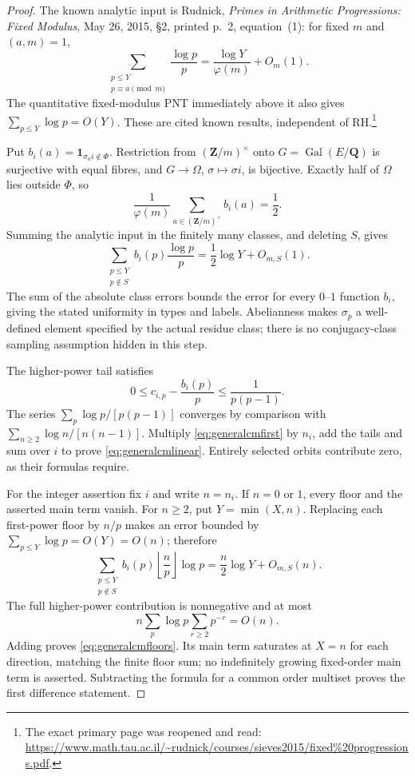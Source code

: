 \begin{proof}
The known analytic input is Rudnick, \emph{Primes in Arithmetic
Progressions: Fixed Modulus}, May 26, 2015, \S2, printed p.~2,
equation~(1): for fixed $m$ and $(a,m)=1$,
\[
 \sum_{\substack{p\le Y\\p\equiv a\pmod m}}\frac{\log p}{p}
 =\frac{\log Y}{\varphi(m)}+O_m(1).
\]
The quantitative fixed-modulus PNT immediately above it also gives
$\sum_{p\le Y}\log p=O(Y)$.
These are cited known results, independent of RH.\footnote{The exact
primary page was reopened and read:
\url{https://www.math.tau.ac.il/~rudnick/courses/sieves2015/fixed\%20progressions.pdf}.}

Put $b_i(a)=\mathbf1_{\sigma_a i\notin\Phi}$.
Restriction from $(\mathbf Z/m)^\times$ onto
$G=\operatorname{Gal}(E/\mathbf Q)$ is surjective with equal fibres,
and $G\to\Omega$, $\sigma\mapsto\sigma i$, is bijective.
Exactly half of $\Omega$ lies outside $\Phi$, so
\[
 \frac1{\varphi(m)}\sum_{a\in(\mathbf Z/m)^\times}b_i(a)=\frac12.
\]
Summing the analytic input in the finitely many classes, and deleting
$S$, gives
\begin{equation}\label{eq:generalcmfirst}
 \sum_{\substack{p\le Y\\p\notin S}}b_i(p)\frac{\log p}{p}
 =\frac12\log Y+O_{m,S}(1).
\end{equation}
The sum of the absolute class errors bounds the error for every
$0$--$1$ function $b_i$, giving the stated uniformity in types and
labels. Abelianness makes $\sigma_p$ a well-defined element specified
by the actual residue class; there is no conjugacy-class sampling
assumption hidden in this step.

The higher-power tail satisfies
\[
 0\le c_{i,p}-\frac{b_i(p)}p\le\frac1{p(p-1)}.
\]
The series $\sum_p\log p/[p(p-1)]$ converges by comparison with
$\sum_{n\ge2}\log n/[n(n-1)]$.
Multiply \eqref{eq:generalcmfirst} by $n_i$, add the tails and sum
over $i$ to prove \eqref{eq:generalcmlinear}.
Entirely selected orbits contribute zero, as their formulas require.

For the integer assertion fix $i$ and write $n=n_i$.
If $n=0$ or $1$, every floor and the asserted main term vanish.
For $n\ge2$, put $Y=\min(X,n)$.
Replacing each first-power floor by $n/p$ makes an error bounded
by $\sum_{p\le Y}\log p=O(Y)=O(n)$; therefore
\[
 \sum_{\substack{p\le Y\\p\notin S}}
 b_i(p)\left\lfloor\frac np\right\rfloor\log p
 =\frac n2\log Y+O_{m,S}(n).
\]
The full higher-power contribution is nonnegative and at most
\[
 n\sum_p\log p\sum_{r\ge2}p^{-r}=O(n).
\]
Adding proves \eqref{eq:generalcmfloors}.
Its main term saturates at $X=n$ for each direction, matching the
finite floor sum; no indefinitely growing fixed-order main term is
asserted. Subtracting the formula for a common order multiset proves
the first difference statement.


\end{proof}
